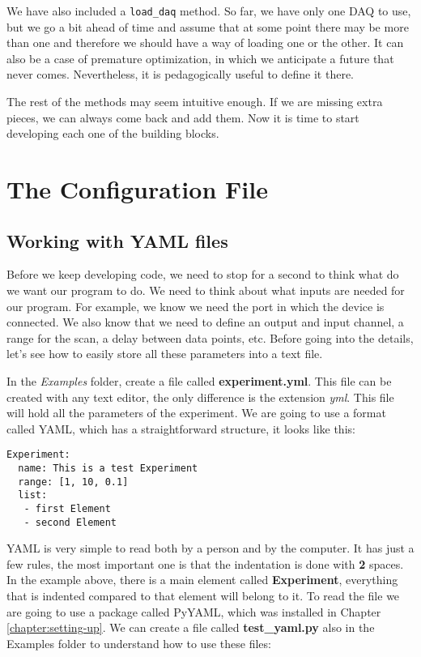 We have also included a \texttt{load\_daq} method. So far, we have only one DAQ to use, but we go a bit ahead of time and assume that at some point there may be more than one and therefore we should have a way of loading one or the other. It can also be a case of premature optimization, in which we anticipate a future that never comes. Nevertheless, it is pedagogically useful to define it there. 

The rest of the methods may seem intuitive enough. If we are missing extra pieces, we can always come back and add them. Now it is time to start developing each one of the building blocks.

\section{The Configuration File}\label{section:configuration-file}
\subsection{Working with YAML files}\label{subsection:yaml-files}
Before we keep developing code, we need to stop for a second to think what do we want our program to do. We need to think about what inputs are needed for our program. For example, we know we need the port in which the device is connected. We also know that we need to define an output and input channel, a range for the scan, a delay between data points, etc. Before going into the details, let's see how to easily store all these parameters into a text file. 

In the \emph{Examples} folder, create a file called \textbf{experiment.yml}. This file can be created with any text editor, the only difference is the extension \emph{yml}. This file will hold all the parameters of the experiment. We are going to use a format called {YAML}, which has a straightforward structure, it looks like this:

\begin{verbatim}
Experiment:
  name: This is a test Experiment
  range: [1, 10, 0.1]
  list:
   - first Element
   - second Element
\end{verbatim}

{YAML} is very simple to read both by a person and by the computer. It has just a few rules, the most important one is that the indentation is done with \textbf{2} spaces. In the example above, there is a main element called \textbf{Experiment}, everything that is indented compared to that element will belong to it. To read the file we are going to use a package called PyYAML, which was installed in Chapter \ref{chapter:setting-up}. We can create a file called \textbf{test\_yaml.py} also in the Examples folder to understand how to use these files:

